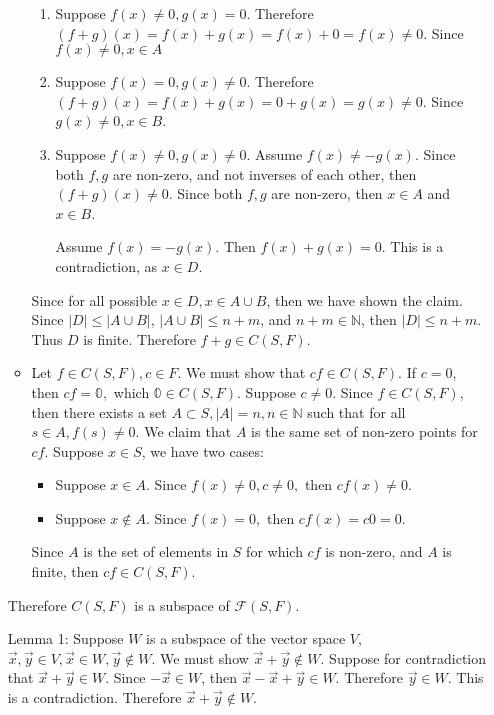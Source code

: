 \documentclass[12pt, letterpaper]{article}
\newcommand{\N}{\mathbb{N}}
\begin{document}
\begin{enumerate}
\begin{itemize}
			\begin{enumerate}
				\item Suppose $f(x) \neq 0, g(x) = 0$.  Therefore $(f+g)(x) = f(x) + g(x) = f(x) + 0 = f(x) \neq 0$.  Since $f(x) \neq 0, x \in A$
				\item Suppose $f(x) = 0, g(x) \neq 0$.
				Therefore $(f+g)(x) = f(x) + g(x) = 0 +g(x) = g(x) \neq 0$.  Since $g(x) \neq 0, x \in B$.
				\item Suppose $f(x) \neq 0, g(x) \neq 0$.  Assume $f(x) \neq -g(x)$.  Since both $f,g$ are non-zero, and not inverses of each other, then $(f+g)(x) \neq 0$.  Since both $f,g$ are non-zero, then $x\in A$ and $x \in B$.
				
				  Assume $f(x) = -g(x)$.  Then $f(x) + g(x) = 0$.  This is a contradiction, as $x \in D$.
			\end{enumerate}
			Since for all possible $x \in D, x \in A \cup B$, then we have shown the claim.  Since $|D| \leq |A\cup B|$, $|A\cup B| \leq n + m$, and $n +m \in \N$, then $|D| \leq n+m$.  Thus $D$ is finite.  Therefore $f+g \in C(S,F)$.
			\item Let $f \in C(S,F), c \in F.$  We must show that $c f \in C(S,F).$  If $c = 0$, then $c f = \mathbb{0},$ which $\mathbb{0} \in C(S,F)$.  Suppose $c \neq 0$.  Since $f \in C(S,F)$, then there exists a set $A \subset S, |A| = n, n \in \N$ such that for all $s\in A, f(s) \neq 0.$  We claim that $A$ is the same set of non-zero points for $c f$.  Suppose $x \in S$, we have two cases:
			\begin{itemize}
				\item Suppose $x \in A.$  Since $f(x) \neq 0, c \neq 0,$ then $c f(x) \neq 0$.
				\item Suppose $x  \not \in A.$  Since $f(x) = 0,$ then $c f(x) = c 0 = 0.$    
			\end{itemize}
			Since $A$ is the set of elements in $S$ for which $cf$ is non-zero, and $A$ is finite, then $cf \in C(S,F).$	       
		\end{itemize}
		Therefore $C(S,F)$ is a subspace of $\mathcal{F}(S,F).$
		\newpage
		
Lemma 1:  Suppose $W$ is a subspace of the vector space $V$, $\Vec{x},\Vec{y} \in V, \Vec{x} \in W, \Vec{y} \not \in W$.  We must show $\Vec{x} + \Vec{y} \not \in W$.  Suppose for contradiction that $\Vec{x} + \Vec{y} \in W$.  Since $-\Vec{x} \in W$, then $\Vec{x} - \Vec{x} + \Vec{y} \in W$.  Therefore $\Vec{y} \in W$.  This is a contradiction.  Therefore $\Vec{x} + \Vec{y} \not \in W$.		
		

\end{enumerate}
\end{document}
